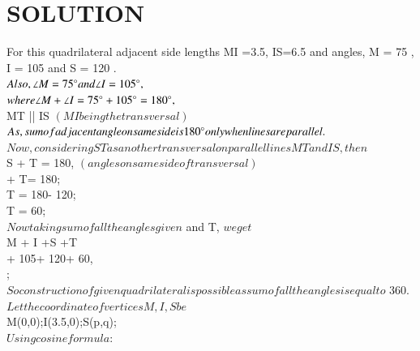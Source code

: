 \documentclass[journal,12pt,twocolumn]{IEEEtran}
\begin{document}
\section{SOLUTION}
For this quadrilateral adjacent side lengths MI =3.5, IS=6.5
and angles, \angle M = 75 \degree, \angle I = 105 \degree and \angle S = 120 \degree.
\\
$Also, \angle M = 75 \degree and \angle I = 105\degree,$
\\
$where  \angle M +\angle I = 75\degree + 105\degree =180\degree,$
\\
 \implies MT || IS $(MI being the transversal)$
\\
$ As, sum of adjacent angle on same side is 180\degree only when lines are parallel.$
\\
$ Now, considering ST as another transversal on parallel lines MT and IS , then $
\\
 \angle S + \angle T = 180\degree, $(angles on same side of transversal) $
\\
 \degree + \angle T= 180\degree;
\\
 \implies\angle T = 180\degree - 120\degree;
\\
 \implies \angle T = 60\degree;
\\
$ Now taking sum of all the angles given $ and \angle T, $ we get $
\\
\implies  \angle M + \angle I +\angle S +\angle T
\\
\degree + 105\degree + 120\degree + 60\degree,
\\
\degree; 
\\
$ So construction of given quadrilateral is possible as sum of all the angles is equal to $ 360\degree.
\\
$Let the coordinate of vertices M,I,S be$
\\
M(0,0);I(3.5,0);S(p,q);
\\
$Using cosine formula: $
\\
\end{document}
